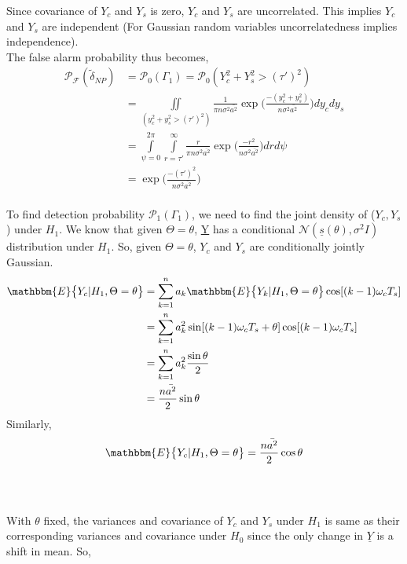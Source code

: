 \documentclass[a4paper,english,12pt]{article}
\begin{document}
\par Since covariance of $Y_c$ and $Y_s$ is zero, $Y_c$ and $Y_s$ are uncorrelated. This implies $Y_c$ and $Y_s$ 
are independent (For Gaussian random variables uncorrelatedness implies independence).\\
The false alarm probability thus becomes,
\begin{equation*}
\begin{aligned}
\mathcal{P_F}(\tilde{\delta}_{NP}) &=\mathcal{P}_0(\Gamma_1)   
= \mathcal{P}_0(Y_c^2+Y_s^2>(\tau')^2) \\
&=\iint \limits_{(y_c^2+y_s^2>(\tau')^2)}^{} \frac{1}{\pi n\sigma^2\bar{a^2}}  \exp\bigg(\frac{ -(y_c^2+y_s^2)}{n\sigma^2\bar{a^2}}\bigg)dy_c dy_s \\
&=\int \limits_{\psi=0}^{2\pi}\int \limits_{r=\tau'}^{\infty}\frac{r}{\pi n\sigma^2\bar{a^2}}   \exp\bigg(\frac{ -r^2}{n\sigma^2\bar{a^2}}\bigg)dr d\psi  \\
&=\exp\bigg(\frac{-(\tau')^2}{n\sigma^2\bar{a^2}}\bigg)  \\
\end{aligned}
\end{equation*}
\par To find detection probability $\mathcal{P}_1(\Gamma_1)$, we need to find the joint density of ($Y_c,Y_s$) under $H_1$. We know that given $\Theta=\theta$, \underline{Y} has a conditional $\mathcal{N}(\underline{s}(\theta),\sigma^2I)$ distribution under $H_1$. So, given $\Theta=\theta$, $Y_c$ and $Y_s$ are conditionally jointly Gaussian.     
\begin{equation*}
\begin{aligned}
\mathbbm{E}\big\{Y_c|H_1, \Theta=\theta\big\} &= \sum_{k=1}^{n}a_k\mathbbm{E}\big\{Y_k|H_1, \Theta=\theta\big\}\cos[(k-1)\omega_c T_s] \\
&=\sum_{k=1}^{n}a_k^2 \sin[(k-1)\omega_c T_s+\theta]\cos[(k-1)\omega_c T_s] \\
&=\sum_{k=1}^{n}a_k^2 \frac{\sin\theta}{2} \\
&=\frac{n\bar{a^2}}{2}\sin\theta
\end{aligned}
\end{equation*}
Similarly, 
\begin{equation*}
\mathbbm{E}\big\{Y_c|H_1, \Theta=\theta\big\}=
\frac{n\bar{a^2}}{2}\cos\theta
\end{equation*} \\ \\
\par With $\theta$ fixed, the variances and covariance of $Y_c$ and $Y_s$ under $H_1$ is same as their corresponding variances and covariance under $H_0$ since the only change in $\underline{Y}$ is a shift in mean. So,
\end{document}
